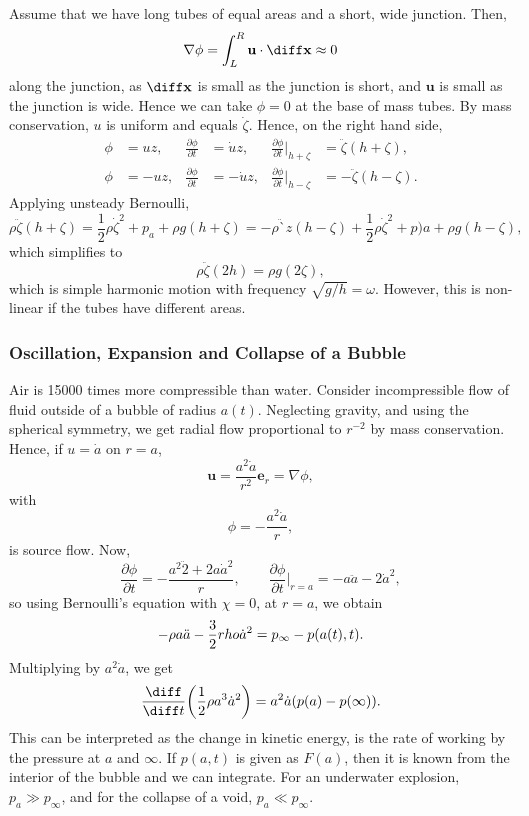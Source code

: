 \documentclass[12pt]{article}
\begin{document}
Assume that we have long tubes of equal areas and a short, wide junction. Then,
\[
\nabla \phi = \int_{L}^{R} \mathbf{u} \cdot \diff \mathbf{x} \approx 0
\]
along the junction, as $\diff \mathbf{x}$ is small as the junction is short, and $\mathbf{u}$ is small as the junction is wide. Hence we can take $\phi = 0$ at the base of mass tubes. By mass conservation, $u$ is uniform and equals $\dot \zeta$. Hence, on the right hand side,
\begin{align*}
	\phi &= uz, & \frac{\partial \phi}{\partial t} &= \dot u z, & \frac{\partial \phi}{\partial t} \biggr|_{h + \zeta} &= \ddot \zeta(h + \zeta), \\
	\phi &= -uz, & \frac{\partial \phi}{\partial t} &= - \dot uz, &\frac{\partial \phi}{\partial t} \biggr|_{h - \zeta} &= - \ddot \zeta(h - \zeta).
\end{align*}
Applying unsteady Bernoulli,
\[
\rho \ddot \zeta (h + \zeta) = \frac{1}{2} \rho \dot \zeta^2 + p_a + \rho g(h + \zeta) = - \rho \ddot `z (h - \zeta) + \frac{1}{2} \rho \dot \zeta^2 + p)a + \rho g(h - \zeta),
\]
which simplifies to
\[
\rho \ddot \zeta(2h) = \rho g(2 \zeta),
\]
which is simple harmonic motion with frequency $\sqrt{g/h} = \omega$. However, this is non-linear if the tubes have different areas.

\subsubsection{Oscillation, Expansion and Collapse of a Bubble}
\label{subsub:bubbles}

Air is \num{15000} times more compressible than water. Consider incompressible flow of fluid outside of a bubble of radius $a(t)$. Neglecting gravity, and using the spherical symmetry, we get radial flow proportional to $r^{-2}$ by mass conservation. Hence, if $u = \dot a$ on $r = a$,
\[
\mathbf{u} = \frac{a^2 \dot a}{r^2} \mathbf{e}_r = \nabla \phi,
\]
with
\[
\phi = - \frac{a^2 \dot a}{r},
\]
is source flow. Now,
\[
\frac{\partial \phi}{\partial t} = - \frac{a^2 \ddot 2 + 2 a \dot a ^2}{r}, \qquad \frac{\partial \phi}{\partial t}\biggr|_{r = a} = -a \ddot a - 2 \dot a^2,
\]
so using Bernoulli's equation with $\chi = 0$, at $r = a$, we obtain
\[
- \rho a \ddot a - \frac{3}{2} \\rho \dot a^2 = p_{\infty} - p(a(t), t).
\]
Multiplying by $a^2 \dot a$, we get
\[
\frac{\diff}{\diff t} \biggl( \frac{1}{2} \rho a^3 \dot a^2 \biggr) = a^2 \dot a (p(a) - p(\infty)).
\]
This can be interpreted as the change in kinetic energy, is the rate of working by the pressure at $a$ and $\infty$. If $p(a, t)$ is given as $F(a)$, then it is known from the interior of the bubble and we can integrate. For an underwater explosion, $p_a \gg p_{\infty}$, and for the collapse of a void, $p_a \ll p_{\infty}$.
\end{document}
